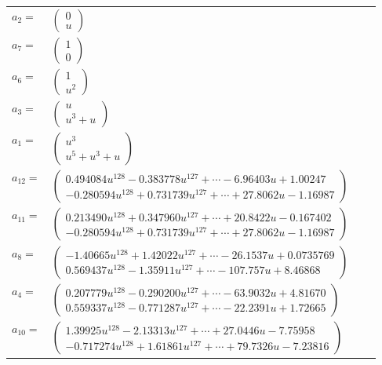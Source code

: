 \documentclass[1p]{elsarticle_modified}
\theoremstyle{definition}
\begin{document}
\begin{tabular}{m{7pt} m{180pt} m{7pt} m{180pt} }
\flushright $a_{2}=$&$\begin{pmatrix}0\\u\end{pmatrix}$ \\
\flushright $a_{7}=$&$\begin{pmatrix}1\\0\end{pmatrix}$ \\
\flushright $a_{6}=$&$\begin{pmatrix}1\\u^2\end{pmatrix}$ \\
\flushright $a_{3}=$&$\begin{pmatrix}u\\u^3+u\end{pmatrix}$ \\
\flushright $a_{1}=$&$\begin{pmatrix}u^3\\u^5+u^3+u\end{pmatrix}$ \\
\flushright $a_{12}=$&$\begin{pmatrix}0.494084 u^{128}-0.383778 u^{127}+\cdots-6.96403 u+1.00247\\-0.280594 u^{128}+0.731739 u^{127}+\cdots+27.8062 u-1.16987\end{pmatrix}$ \\
\flushright $a_{11}=$&$\begin{pmatrix}0.213490 u^{128}+0.347960 u^{127}+\cdots+20.8422 u-0.167402\\-0.280594 u^{128}+0.731739 u^{127}+\cdots+27.8062 u-1.16987\end{pmatrix}$ \\
\flushright $a_{8}=$&$\begin{pmatrix}-1.40665 u^{128}+1.42022 u^{127}+\cdots-26.1537 u+0.0735769\\0.569437 u^{128}-1.35911 u^{127}+\cdots-107.757 u+8.46868\end{pmatrix}$ \\
\flushright $a_{4}=$&$\begin{pmatrix}0.207779 u^{128}-0.290200 u^{127}+\cdots-63.9032 u+4.81670\\0.559337 u^{128}-0.771287 u^{127}+\cdots-22.2391 u+1.72665\end{pmatrix}$ \\
\flushright $a_{10}=$&$\begin{pmatrix}1.39925 u^{128}-2.13313 u^{127}+\cdots+27.0446 u-7.75958\\-0.717274 u^{128}+1.61861 u^{127}+\cdots+79.7326 u-7.23816\end{pmatrix}$ \\

\end{tabular}
\end{document}
